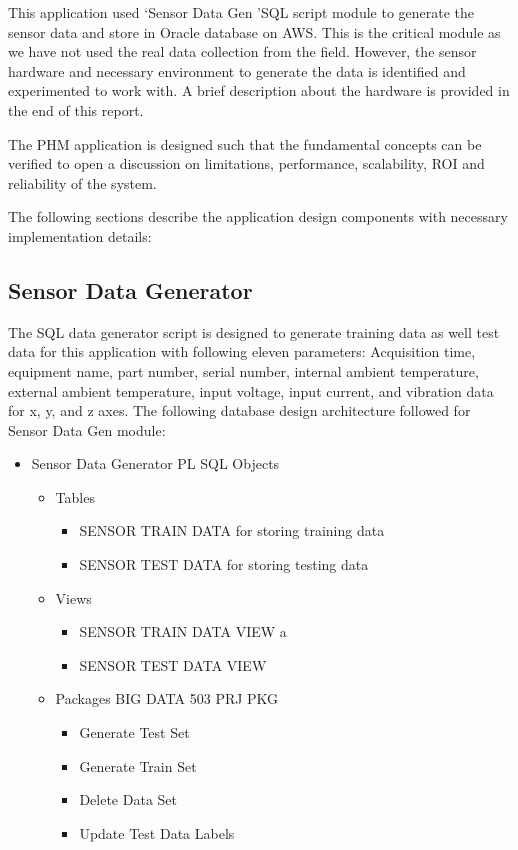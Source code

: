 \documentclass[sigconf]{acmart}
\begin{document}
This application used \lq Sensor Data Gen \rq SQL script module to generate the sensor data and store in Oracle database on AWS. This is the critical module as we have not used the real data collection from the field. However, the sensor hardware and necessary environment to generate the data is identified and experimented to work with. A brief description about the hardware is provided in the end of this report.

The PHM application is designed such that the fundamental concepts can be verified to open a discussion on limitations, performance, scalability, ROI and reliability of the system.

The following sections describe the application design components with necessary implementation details:
\subsection{Sensor Data Generator}
The SQL data generator script is designed to generate training data as well test data for this application with following eleven parameters: Acquisition time, equipment name, part number, serial number, internal ambient temperature, external ambient temperature, input voltage, input current, and vibration data for x, y, and z axes. 
The following database design architecture followed for Sensor Data Gen module:
\begin{itemize}
  \item Sensor Data Generator PL SQL Objects
  \begin{itemize}
  \item Tables
\begin{itemize}
\item SENSOR TRAIN DATA for storing training data
\item SENSOR TEST DATA for storing testing data
\end{itemize}
\item Views
\begin{itemize}
\item SENSOR TRAIN DATA VIEW a
\item SENSOR TEST DATA VIEW
\end{itemize}
\item Packages BIG DATA 503 PRJ PKG
\begin{itemize}
\item Generate Test Set
\item Generate Train Set
\item Delete Data Set
\item Update Test Data Labels
\end{itemize}
\end{itemize}
\end{itemize}
\end{document}
